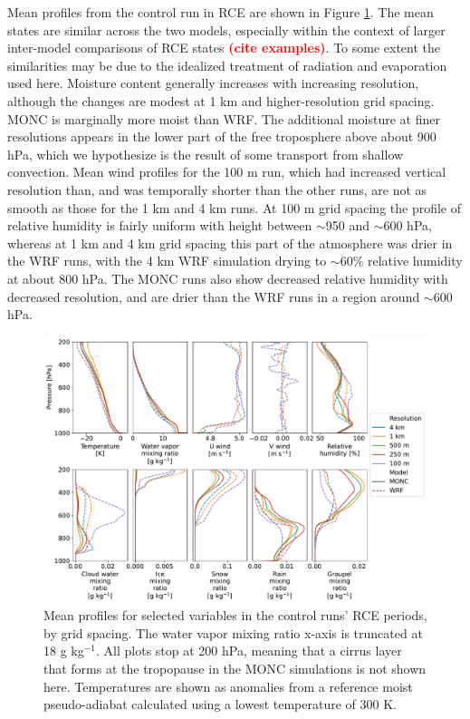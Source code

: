 \documentclass[draft]{agujournal2019}
\newcommand{\todo}[1]{\textcolor{red}{\textbf{(#1)}}}
\begin{document}
Mean profiles from the control run in RCE are shown in Figure
\ref{fig:rce_profiles}. The mean states are similar across the two models,
especially within the context of larger inter-model comparisons of RCE states
\todo{cite examples}. To some extent the similarities may be due to the
idealized treatment of radiation and evaporation used here. Moisture content
generally increases with increasing resolution, although the changes are modest
at 1 km and higher-resolution grid spacing. MONC is marginally more moist than
WRF. The additional moisture at finer resolutions appears in the lower part of
the free troposphere above about 900 hPa, which we hypothesize is the result of
some transport from shallow convection. Mean wind profiles for the 100 m run,
which had increased vertical resolution than, and was temporally shorter than
the other runs, are not as smooth as those for the 1 km and 4 km runs. At 100 m
grid spacing the profile of relative humidity is fairly uniform with height
between $\sim$950 and $\sim$600 hPa, whereas at 1 km and 4 km grid spacing this
part of the atmosphere was drier in the WRF runs, with the 4 km WRF simulation
drying to $\sim$60\% relative humidity at about 800 hPa. The MONC runs also show
decreased relative humidity with decreased resolution, and are drier than the
WRF runs in a region around $\sim$600 hPa.

\begin{figure}[pth]
    \noindent\includegraphics[width=\textwidth]{figures/rce_profiles}
    \caption{Mean profiles for selected variables in the control runs' RCE
    periods, by grid spacing. The water vapor mixing ratio x-axis is truncated
    at 18 g kg$^{-1}$. All plots stop at 200 hPa, meaning that a cirrus layer
    that forms at the tropopause in the MONC simulations is not shown here.
    Temperatures are shown as anomalies from a reference moist pseudo-adiabat
    calculated using a lowest temperature of 300 K.}
    \label{fig:rce_profiles}
\end{figure}
\end{document}
